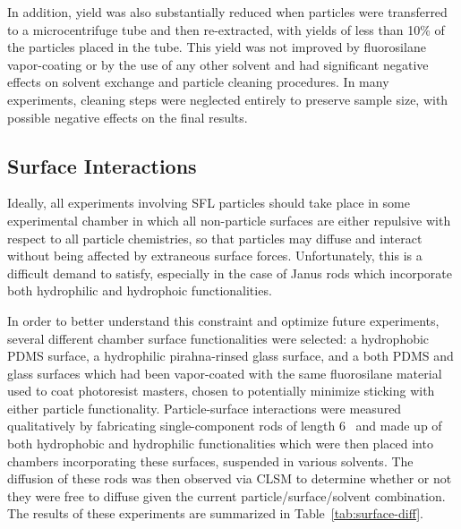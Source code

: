 In addition, yield was also substantially reduced when particles were transferred to a microcentrifuge tube
and then re-extracted, with yields of less than 10\% of the particles placed in the tube.  This yield was
not improved by fluorosilane vapor-coating or by the use of any other solvent and had significant
negative effects on solvent exchange and particle cleaning procedures.  In many experiments, cleaning 
steps were neglected entirely to preserve sample size, with possible negative effects on the final results.

\subsection{Surface Interactions}
\label{sec:surface-interact}

Ideally, all experiments involving SFL particles should take place in some experimental
chamber in which all non-particle surfaces are either repulsive with respect to all
particle chemistries, so that particles may diffuse and interact without 
being affected by extraneous surface forces.  Unfortunately, this is a difficult demand to 
satisfy, especially in the case of Janus rods which incorporate both hydrophilic and 
hydrophoic functionalities. 

In order to better understand this constraint and optimize future experiments, several different 
chamber surface
functionalities were selected: a hydrophobic PDMS surface, a hydrophilic pirahna-rinsed glass surface,
and a both PDMS and glass surfaces which had been vapor-coated with the same fluorosilane material used
to coat photoresist masters, chosen to potentially minimize sticking with either particle functionality.
Particle-surface interactions were measured qualitatively by fabricating single-component rods
of length 6 \microns~and made up of both
hydrophobic and hydrophilic functionalities which were then placed into chambers incorporating these
surfaces, suspended in various solvents.  The diffusion of these rods was then observed via CLSM to 
determine whether or not they were free to diffuse given the current particle/surface/solvent combination.
The results of these experiments are summarized in Table~\ref{tab:surface-diff}.

